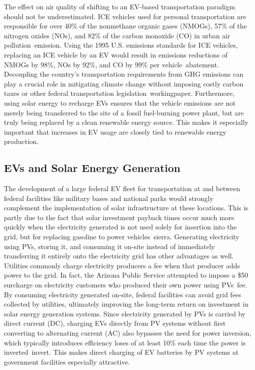 The effect on air quality of shifting to an EV-based transportation paradigm should not be underestimated. ICE vehicles used for personal transportation are responsible for over 40\% of the nonmethane organic gases (NMOGs), 57\% of the nitrogen oxides (NOs), and 82\% of the carbon monoxide (CO) in urban air pollution~\cite{eric}{emission}. Using the 1995 U.S. emissions standards for ICE vehicles, replacing an ICE vehicle by an EV would result in emissions reductions of NMOGs by 98\%, NOs by 92\%, and CO by 99\% per vehicle~\cite{eric}{abatement}. Decoupling the country's transportation requirements from GHG emissions can play a crucial role in mitigating climate change without imposing costly carbon taxes or other federal transportation legislation~\cite{eric}{workingpaper}. Furthermore, using solar energy to recharge EVs ensures that the vehicle emissions are not merely being transferred to the site of a fossil fuel-burning power plant, but are truly being replaced by a clean renewable energy source. This makes it especially important that increases in EV usage are closely tied to renewable energy production.


\subsection{EVs and Solar Energy Generation}


The development of a large federal EV fleet for transportation at and between federal facilities like military bases and national parks would strongly complement the implementation of solar infrastructure at these locations. This is partly due to the fact that solar investment payback times occur much more quickly when the electricity generated is not used solely for insertion into the grid, but for replacing gasoline to power vehicles~\cite{eric}{sierra}. Generating electricity using PVs, storing it, and consuming it on-site instead of immediately transferring it entirely onto the electricity grid has other advantages as well. Utilities commonly charge electricity producers a fee when that producer adds power to the grid. In fact, the Arizona Public Service attempted to impose a \$50 surcharge on electricity customers who produced their own power using PVs~\cite{eric}{fee}. By consuming electricity generated on-site, federal facilities can avoid grid fees collected by utilities, ultimately improving the long-term return on investment in solar energy generation systems. Since electricity generated by PVs is carried by direct current (DC), charging EVs directly from PV systems without first converting to alternating current (AC) also bypasses the need for power inversion, which typically introduces efficiency loses of at least 10\% each time the power is inverted~\cite{eric}{invert}. This makes direct charging of EV batteries by PV systems at government facilities especially attractive.

